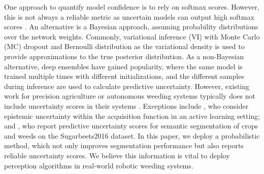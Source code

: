One approach to quantify model confidence is to rely on softmax scores.
However, this is not always a reliable metric as uncertain models can output high softmax scores \cite{pmlr-v48-gal16, pmlr-v162-postels22a}.
An alternative is a Bayesian approach, assuming probability distributions over the network weights.
Commonly, variational inference (VI) with Monte Carlo (MC) dropout \cite{pmlr-v48-gal16} and Bernoulli distribution as the variational density is used to provide approximations to the true posterior distribution.
As a non-Bayesian alternative, deep ensembles \cite{NIPS2017_9ef2ed4b} have gained popularity, where the same model is trained multiple times with different initializations, and the different samples during inference are used to calculate predictive uncertainty. However, existing work for precision agriculture or autonomous weeding systems typically does not include uncertainty scores in their systems \cite{Champ20aps}.
Exceptions include \cite{vanmarrewijk2024active}, who consider epistemic uncertainty within the acquisition function in an active learning setting; and \cite{Celikkan_2023_ICCV}, who report predictive uncertainty scores for semantic segmentation of crops and weeds on the Sugarbeets2016 \cite{chebrolu2017ijrr} dataset.
In this paper, we deploy a probabilistic method, which not only improves segmentation performance but also reports reliable uncertainty scores.
We believe this information is vital to deploy perception algorithms in real-world robotic weeding systems.